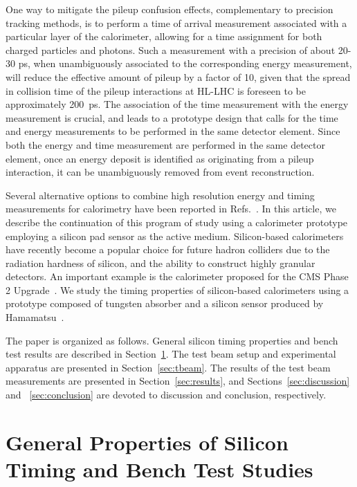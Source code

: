 \documentclass[12pt]{article}
\begin{document}
{One way to mitigate the pileup confusion effects, complementary to precision
tracking methods, is to perform a time of arrival measurement associated with a
particular layer of the calorimeter, allowing for a time assignment for both
charged particles and photons. Such a measurement with a precision of about
20-30 ps, when unambiguously associated to the corresponding energy measurement,
will reduce the effective amount of pileup by a factor of 10, given that the
spread in collision time of the pileup interactions at HL-LHC is foreseen to be
approximately 200~ps. The association of the time measurement with the energy
measurement is crucial, and leads to a prototype design that calls for the time
and energy measurements to be performed in the same detector element. Since both
the energy and time measurement are performed in the same detector element, once
an energy deposit is identified as originating from a pileup interaction, it can
be unambiguously removed from event reconstruction.

Several alternative options to combine high resolution energy and timing
measurements for calorimetry have been reported in Refs.~\cite{Anderson:2015gha,
MCPFastCaloNIMA, Ronzhin2015288, Ronzhin201552, Brianza2015216}. In this
article, we describe the continuation of this program of study using a
calorimeter prototype employing a silicon pad sensor as the active medium.
Silicon-based calorimeters have recently become a popular choice for future
hadron colliders due to the radiation hardness of silicon, and the ability to
construct highly granular detectors. An important example is the calorimeter
proposed for the CMS Phase 2 Upgrade~\cite{Butler:2020886}. We study the timing
properties of silicon-based calorimeters using a prototype composed of tungsten
absorber and a silicon sensor produced by Hamamatsu~\cite{hamamatsu}. 

The paper is organized as follows. General silicon timing properties 
and bench test results are described in Section~\ref{sec:siliconpad}. 
The test beam setup and experimental apparatus are presented in Section~\ref{sec:tbeam}. 
The results of the test beam measurements are presented in Section~\ref{sec:results},
and Sections~\ref{sec:discussion} and ~\ref{sec:conclusion} are devoted to discussion and 
conclusion, respectively.


\section{General Properties of Silicon Timing and Bench Test Studies}
\label{sec:siliconpad}

}
\end{document}
